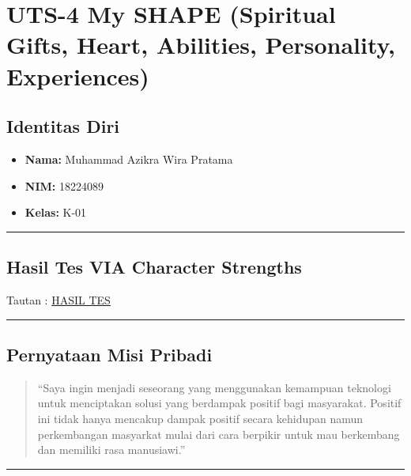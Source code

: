 \documentclass[
  letterpaper,
  DIV=11,
  numbers=noendperiod]{scrreprt}
\providecommand{\tightlist}{%
  \setlength{\itemsep}{0pt}\setlength{\parskip}{0pt}}
\begin{document}
\chapter{UTS-4 My SHAPE (Spiritual Gifts, Heart, Abilities, Personality,
Experiences)}\label{uts-4-my-shape-spiritual-gifts-heart-abilities-personality-experiences}

\section{Identitas Diri}\label{identitas-diri-1}

\begin{itemize}
\tightlist
\item
  \textbf{Nama:} Muhammad Azikra Wira Pratama\\
\item
  \textbf{NIM:} 18224089
\item
  \textbf{Kelas:} K-01
\end{itemize}

\begin{center}\rule{0.5\linewidth}{0.5pt}\end{center}

\section{Hasil Tes VIA Character
Strengths}\label{hasil-tes-via-character-strengths}

Tautan : \href{StrengthsProfile-MuhammadAzikra-WiraPratama.pdf}{HASIL
TES}

\begin{center}\rule{0.5\linewidth}{0.5pt}\end{center}

\section{Pernyataan Misi Pribadi}\label{pernyataan-misi-pribadi}

\begin{quote}
``Saya ingin menjadi seseorang yang menggunakan kemampuan teknologi
untuk menciptakan solusi yang berdampak positif bagi masyarakat. Positif
ini tidak hanya mencakup dampak positif secara kehidupan namun
perkembangan masyarkat mulai dari cara berpikir untuk mau berkembang dan
memiliki rasa manusiawi.''
\end{quote}

\begin{center}\rule{0.5\linewidth}{0.5pt}\end{center}
\end{document}
